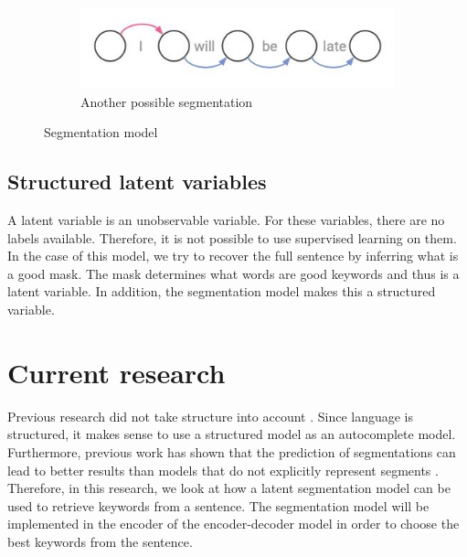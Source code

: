 \begin{figure}
    \begin{subfigure}[b]{0.45\textwidth}
        \centering
        \includegraphics[width=\textwidth]{figs/segmentation4.jpeg}
        \caption{Another possible segmentation}
        \label{fig:segmentation2}
    \end{subfigure}
    \caption{Segmentation model}
    \label{fig:segmentation_model}
\end{figure}


\subsection{Structured latent variables}
A latent variable is an unobservable variable.
For these variables, there are no labels available. 
Therefore, it is not possible to use supervised learning on them. 
In the case of this model, we try to recover the full sentence by inferring what is a good mask.
The mask determines what words are good keywords and thus is a latent variable. 
In addition, the segmentation model makes this a structured variable. 


\section{Current research}

Previous research did not take structure into account \cite{autocomplete, Bar-YossefZiv2011Cqa, SvyatkovskiyAlexey2019PACC}.
Since language is structured, it makes sense to use a structured model as an autocomplete model. 
Furthermore, previous work has shown that the prediction of segmentations can lead to better results than models that do not explicitly represent segments \cite{conditionalRandomFields,kong2016segmentalrecurrentneuralnetworks}. 
Therefore, in this research, we look at how a latent segmentation model can be used to retrieve keywords from a sentence. 
The segmentation model will be implemented in the encoder of the encoder-decoder model in order to choose the best keywords from the sentence.